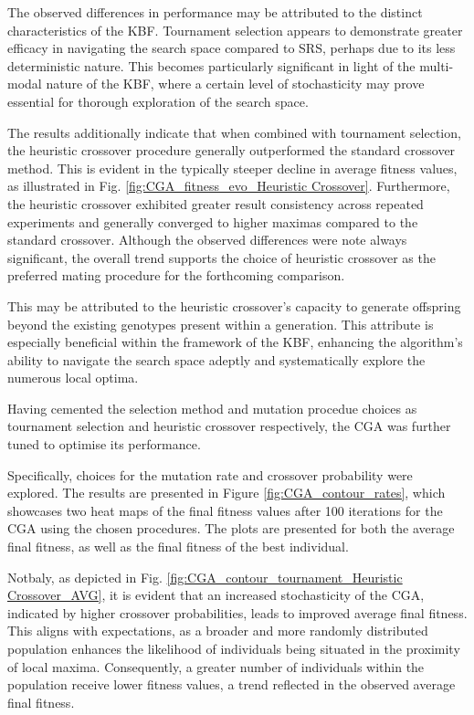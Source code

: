 \documentclass[10pt]{article}
\begin{document}
\begin{multicols}{2}
The observed differences in performance may be attributed to the distinct characteristics of the KBF. Tournament selection appears to demonstrate greater efficacy in navigating the search space compared to SRS, perhaps due to its less deterministic nature. This becomes particularly significant in light of the multi-modal nature of the KBF, where a certain level of stochasticity may prove essential for thorough exploration of the search space.

The results additionally indicate that when combined with tournament selection, the heuristic crossover procedure generally outperformed the standard crossover method. This is evident in the typically steeper decline in average fitness values, as illustrated in Fig. \ref{fig:CGA_fitness_evo_Heuristic Crossover}. Furthermore, the heuristic crossover exhibited greater result consistency across repeated experiments and generally converged to higher maximas compared to the standard crossover. Although the observed differences were note always significant, the overall trend supports the choice of heuristic crossover as the preferred mating procedure for the forthcoming comparison.

This may be attributed to the heuristic crossover's capacity to generate offspring beyond the existing genotypes present within a generation. This attribute is especially beneficial within the framework of the KBF, enhancing the algorithm's ability to navigate the search space adeptly and systematically explore the numerous local optima.

Having cemented the selection method and mutation procedue choices as tournament selection and heuristic crossover respectively, the CGA was further tuned to optimise its performance. 

Specifically, choices for the mutation rate and crossover probability were explored. The results are presented in Figure \ref{fig:CGA_contour_rates}, which showcases two heat maps of the final fitness values after 100 iterations for the CGA using the chosen procedures. The plots are presented for both the average final fitness, as well as the final fitness of the best individual.

Notbaly, as depicted in Fig. \ref{fig:CGA_contour_tournament_Heuristic Crossover_AVG}, it is evident that an increased stochasticity of the CGA, indicated by higher crossover probabilities, leads to improved average final fitness. This aligns with expectations, as a broader and more randomly distributed population enhances the likelihood of individuals being situated in the proximity of local maxima. Consequently, a greater number of individuals within the population receive lower fitness values, a trend reflected in the observed average final fitness.


\end{multicols}
\end{document}
